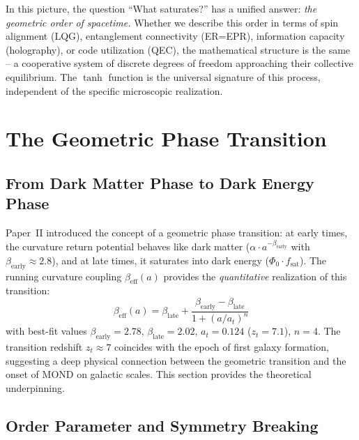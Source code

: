 \documentclass[aps,prd,twocolumn,superscriptaddress,nofootinbib]{revtex4-2}
\begin{document}
In this picture, the question ``What saturates?'' has a unified answer: \textit{the geometric order of spacetime.} Whether we describe this order in terms of spin alignment (LQG), entanglement connectivity (ER=EPR), information capacity (holography), or code utilization (QEC), the mathematical structure is the same -- a cooperative system of discrete degrees of freedom approaching their collective equilibrium. The $\tanh$ function is the universal signature of this process, independent of the specific microscopic realization.


\section{The Geometric Phase Transition}
\label{sec:phase_transition}

\subsection{From Dark Matter Phase to Dark Energy Phase}

Paper~II \cite{Geiger2026b} introduced the concept of a geometric phase transition: at early times, the curvature return potential behaves like dark matter ($\alpha \cdot a^{-\beta_{\mathrm{early}}}$ with $\beta_{\mathrm{early}} \approx 2.8$), and at late times, it saturates into dark energy ($\Phi_0 \cdot f_{\mathrm{sat}}$). The running curvature coupling $\beta_{\mathrm{eff}}(a)$ provides the \textit{quantitative} realization of this transition:
\begin{equation}
\beta_{\mathrm{eff}}(a) = \beta_{\mathrm{late}} + \frac{\beta_{\mathrm{early}} - \beta_{\mathrm{late}}}{1 + (a/a_t)^n}
\end{equation}
with best-fit values $\beta_{\mathrm{early}} = 2.78$, $\beta_{\mathrm{late}} = 2.02$, $a_t = 0.124$ ($z_t = 7.1$), $n = 4$. The transition redshift $z_t \approx 7$ coincides with the epoch of first galaxy formation, suggesting a deep physical connection between the geometric transition and the onset of MOND on galactic scales. This section provides the theoretical underpinning.

\subsection{Order Parameter and Symmetry Breaking}
\end{document}

